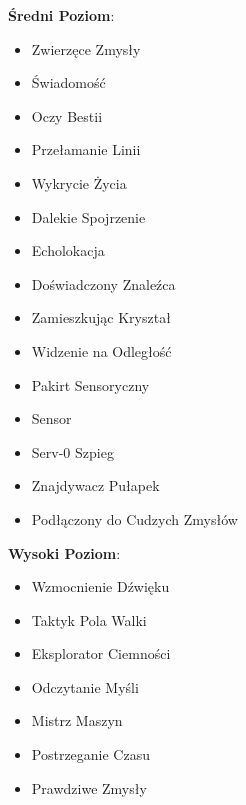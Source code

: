 \textbf{Średni Poziom}:

\begin{itemize}
\item Zwierzęce Zmysły
\item Świadomość
\item Oczy Bestii
\item Przełamanie Linii
\item Wykrycie Życia
\item Dalekie Spojrzenie
\item Echolokacja
\item Doświadczony Znaleźca
\item Zamieszkując Kryształ
\item Widzenie na Odległość
\item Pakirt Sensoryczny
\item Sensor
\item Serv-0 Szpieg
\item Znajdywacz Pułapek
\item Podłączony do Cudzych Zmysłów
\end{itemize}

\textbf{Wysoki Poziom}:

\begin{itemize}
\item Wzmocnienie Dźwięku
\item Taktyk Pola Walki
\item Eksplorator Ciemności
\item Odczytanie Myśli
\item Mistrz Maszyn
\item Postrzeganie Czasu
\item Prawdziwe Zmysły
\end{itemize}